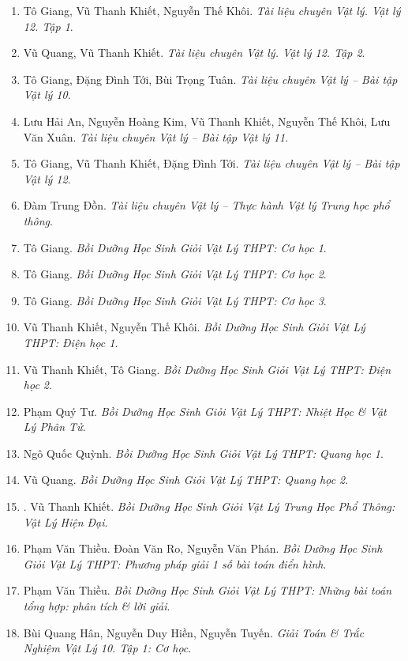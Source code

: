 \documentclass{article}
\begin{document}
\begin{enumerate}	
	\item Tô Giang, Vũ Thanh Khiết, Nguyễn Thế Khôi. \textit{Tài liệu chuyên Vật lý. Vật lý 12. Tập 1}.
	\item Vũ Quang, Vũ Thanh Khiết. \textit{Tài liệu chuyên Vật lý. Vật lý 12. Tập 2}.
	\item Tô Giang, Đặng Đình Tới, Bùi Trọng Tuân. \textit{Tài liệu chuyên Vật lý -- Bài tập Vật lý 10}.
	\item Lưu Hải An, Nguyễn Hoàng Kim, Vũ Thanh Khiết, Nguyễn Thế Khôi, Lưu Văn Xuân. \textit{Tài liệu chuyên Vật lý -- Bài tập Vật lý 11}.
	\item Tô Giang, Vũ Thanh Khiết, Đặng Đình Tới. \textit{Tài liệu chuyên Vật lý -- Bài tập Vật lý 12}.
	\item Đàm Trung Đồn. \textit{Tài liệu chuyên Vật lý -- Thực hành Vật lý Trung học phổ thông}.
	\item Tô Giang. \textit{Bồi Dưỡng Học Sinh Giỏi Vật Lý THPT: Cơ học 1}.\hfill{\sf[reading]}
	\item Tô Giang. \textit{Bồi Dưỡng Học Sinh Giỏi Vật Lý THPT: Cơ học 2}.\hfill{\sf[reading]}
	\item Tô Giang. \textit{Bồi Dưỡng Học Sinh Giỏi Vật Lý THPT: Cơ học 3}.\hfill{\sf[reading]}
	\item Vũ Thanh Khiết, Nguyễn Thế Khôi. \textit{Bồi Dưỡng Học Sinh Giỏi Vật Lý THPT: Điện học 1}.\hfill{\sf[reading]}
	\item Vũ Thanh Khiết, Tô Giang. \textit{Bồi Dưỡng Học Sinh Giỏi Vật Lý THPT: Điện học 2}.\hfill{\sf[reading]}
	\item Phạm Quý Tư. \textit{Bồi Dưỡng Học Sinh Giỏi Vật Lý THPT: Nhiệt Học \& Vật Lý Phân Tử}.
	\item Ngô Quốc Quỳnh. \textit{Bồi Dưỡng Học Sinh Giỏi Vật Lý THPT: Quang học 1}.\hfill{\sf[reading]}
	\item Vũ Quang. \textit{Bồi Dưỡng Học Sinh Giỏi Vật Lý THPT: Quang học 2}.
	\item \cite{Khiet_Vat_Ly_hien_dai}. Vũ Thanh Khiết. \textit{Bồi Dưỡng Học Sinh Giỏi Vật Lý Trung Học Phổ Thông: Vật Lý Hiện Đại}.\hfill{\sf[reading]}
	\item Phạm Văn Thiều. Đoàn Văn Ro, Nguyễn Văn Phán. \textit{Bồi Dưỡng Học Sinh Giỏi Vật Lý THPT: Phương pháp giải 1 số bài toán điển hình}.
	\item Phạm Văn Thiều. \textit{Bồi Dưỡng Học Sinh Giỏi Vật Lý THPT: Những bài toán tổng hợp: phân tích \& lời giải}.
	\item Bùi Quang Hân, Nguyễn Duy Hiền, Nguyễn Tuyến. \textit{Giải Toán \& Trắc Nghiệm Vật Lý 10. Tập 1: Cơ học}.

\end{enumerate}
\end{document}
